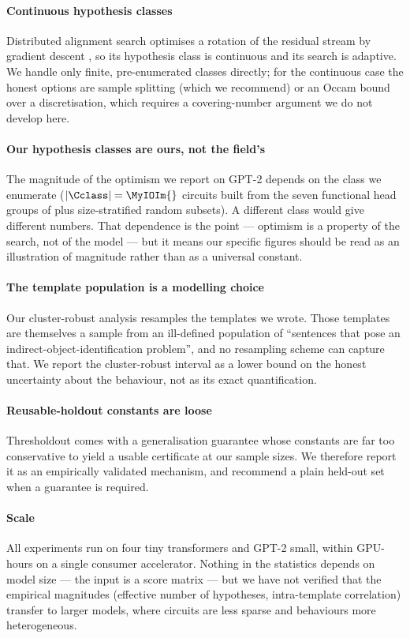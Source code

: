 \paragraph{Continuous hypothesis classes}
Distributed alignment search optimises a rotation of the residual stream by
gradient descent \citep{geiger2024finding}, so its hypothesis class is
continuous and its search is adaptive. We handle only finite, pre-enumerated
classes directly; for the continuous case the honest options are sample splitting
(which we recommend) or an Occam bound over a discretisation, which requires a
covering-number argument we do not develop here.

\paragraph{Our hypothesis classes are ours, not the field's}
The magnitude of the optimism we report on GPT-2 depends on the class we
enumerate ($|\Cclass|=\MyIOIm{}$ circuits built from the seven functional head
groups of \citet{wang2023interpretability} plus size-stratified random subsets).
A different class would give different numbers. That dependence is the point ---
optimism is a property of the search, not of the model --- but it means our
specific figures should be read as an illustration of magnitude rather than as a
universal constant.

\paragraph{The template population is a modelling choice}
Our cluster-robust analysis resamples the \MyIOINTemplates{} templates we wrote.
Those templates are themselves a sample from an ill-defined population of
``sentences that pose an indirect-object-identification problem'', and no
resampling scheme can capture that. We report the cluster-robust interval as a
lower bound on the honest uncertainty about the behaviour, not as its exact
quantification.

\paragraph{Reusable-holdout constants are loose}
Thresholdout \citep{dwork2015reusable} comes with a generalisation guarantee
whose constants are far too conservative to yield a usable certificate at our
sample sizes. We therefore report it as an empirically validated mechanism, and
recommend a plain held-out set when a guarantee is required.

\paragraph{Scale}
All experiments run on four tiny transformers and GPT-2 small, within
\MyComputeHours{} GPU-hours on a single consumer accelerator. Nothing in the
statistics depends on model size --- the input is a score matrix --- but we have
not verified that the empirical magnitudes (effective number of hypotheses,
intra-template correlation) transfer to larger models, where circuits are less
sparse and behaviours more heterogeneous.
